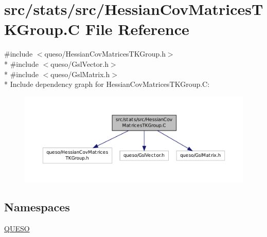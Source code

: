 \hypertarget{_hessian_cov_matrices_t_k_group_8_c}{\section{src/stats/src/\-Hessian\-Cov\-Matrices\-T\-K\-Group.C File Reference}
\label{_hessian_cov_matrices_t_k_group_8_c}
}
{\ttfamily \#include $<$queso/\-Hessian\-Cov\-Matrices\-T\-K\-Group.\-h$>$}\\*
{\ttfamily \#include $<$queso/\-Gsl\-Vector.\-h$>$}\\*
{\ttfamily \#include $<$queso/\-Gsl\-Matrix.\-h$>$}\\*
Include dependency graph for Hessian\-Cov\-Matrices\-T\-K\-Group.\-C\-:
\nopagebreak
\begin{figure}[H]
\begin{center}
\leavevmode
\includegraphics[width=350pt]{_hessian_cov_matrices_t_k_group_8_c__incl}
\end{center}
\end{figure}
\subsection*{Namespaces}
\begin{DoxyCompactItemize}
\item 
\hyperlink{namespace_q_u_e_s_o}{Q\-U\-E\-S\-O}
\end{DoxyCompactItemize}
